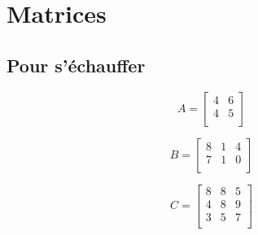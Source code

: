 \documentclass[a4paper]{article}\usepackage[]{graphicx}\usepackage[]{xcolor}
\begin{document}
\section*{Matrices}

\subsection*{Pour s'échauffer}

\begin{minipage}{0.33\linewidth}
    \begin{equation*}
        A = \begin{bmatrix} 4 &6 \\4 &5 \\ \end{bmatrix}
    \end{equation*}
\end{minipage}
\begin{minipage}{0.33\linewidth}
    \begin{equation*}
        B = \begin{bmatrix} 8 &1 &4 \\7 &1 &0 \\ \end{bmatrix}
    \end{equation*}
\end{minipage}
\begin{minipage}{0.33\linewidth}
    \begin{equation*}
        C = \begin{bmatrix} 8 &8 &5 \\4 &8 &9 \\3 &5 &7 \\ \end{bmatrix}
    \end{equation*}
\end{minipage}
\end{document}

